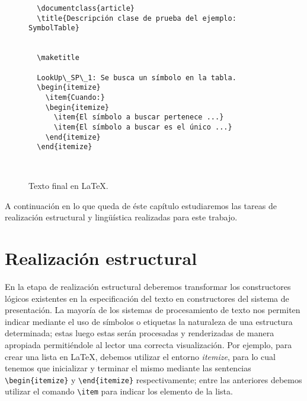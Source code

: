 \begin{figure}[H]
  \begin{verbatim}
  \documentclass{article}
  \title{Descripción clase de prueba del ejemplo: SymbolTable}
  
  
  \maketitle

  LookUp\_SP\_1: Se busca un símbolo en la tabla.  
  \begin{itemize}
    \item{Cuando:}
    \begin{itemize}
      \item{El símbolo a buscar pertenece ...}
      \item{El símbolo a buscar es el único ...}   
    \end{itemize}
  \end{itemize}
  
  
  \end{verbatim}
  \caption{Texto final en \LaTeX.}
  \label{fig:ej_latex}
\end{figure}

A continuación en lo que queda de éste capítulo estudiaremos las tareas de realización estructural y lingüística realizadas para este trabajo.

\section{Realización estructural}
\label{cap:structure_realization}


En la etapa de realización estructural deberemos transformar los constructores lógicos existentes en la especificación del texto en constructores del sistema de presentación. La mayoría de los sistemas de procesamiento de texto nos permiten indicar mediante el uso de símbolos o etiquetas la naturaleza de una estructura determinada; estas luego estas serán procesadas y renderizadas de manera apropiada permitiéndole al lector una correcta visualización. Por ejemplo, para crear una lista en \LaTeX, debemos utilizar el entorno \emph{itemize}, para lo cual tenemos que inicializar y terminar el mismo mediante las sentencias \verb|\begin{itemize}| y \verb|\end{itemize}| respectivamente; entre las anteriores debemos utilizar el comando \verb|\item| para indicar los elemento de la lista.

